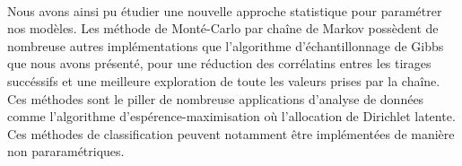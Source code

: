 \documentclass{article}
\theoremstyle{definition}
\theoremstyle{remark}
\begin{document}
\paragraph{}
Nous avons ainsi pu étudier une nouvelle approche statistique pour paramétrer nos modèles. Les méthode de Monté-Carlo par chaîne 
de Markov possèdent de nombreuse autres implémentations que l'algorithme d'échantillonnage de Gibbs que nous avons présenté,
pour une réduction des corrélatins entres les tirages succéssifs et une meilleure exploration de toute les valeurs prises par la chaîne.
Ces méthodes sont le piller de nombreuse applications d'analyse de données comme l'algorithme d'espérence-maximisation 
où l'allocation de Dirichlet latente. Ces méthodes de classification peuvent notamment être implémentées de manière non pararamétriques.


























\end{document}
